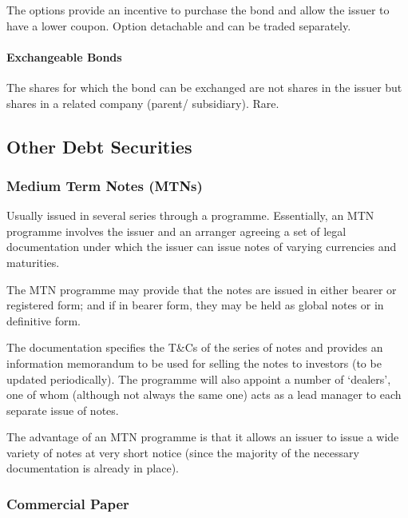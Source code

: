 \documentclass[
]{article}
\begin{document}
The options provide an incentive to purchase the bond and allow the
issuer to have a lower coupon. Option detachable and can be traded
separately.

\hypertarget{exchangeable-bonds}{%
\paragraph{Exchangeable Bonds}\label{exchangeable-bonds}}

The shares for which the bond can be exchanged are not shares in the
issuer but shares in a related company (parent/ subsidiary). Rare.

\hypertarget{other-debt-securities}{%
\subsection{Other Debt Securities}\label{other-debt-securities}}

\hypertarget{medium-term-notes-mtns}{%
\subsubsection{Medium Term Notes (MTNs)}\label{medium-term-notes-mtns}}

Usually issued in several series through a programme. Essentially, an
MTN programme involves the issuer and an arranger agreeing a set of
legal documentation under which the issuer can issue notes of varying
currencies and maturities.

The MTN programme may provide that the notes are issued in either bearer
or registered form; and if in bearer form, they may be held as global
notes or in definitive form.

The documentation specifies the T\&Cs of the series of notes and
provides an information memorandum to be used for selling the notes to
investors (to be updated periodically). The programme will also appoint
a number of `dealers', one of whom (although not always the same one)
acts as a lead manager to each separate issue of notes.

The advantage of an MTN programme is that it allows an issuer to issue a
wide variety of notes at very short notice (since the majority of the
necessary documentation is already in place).

\hypertarget{commercial-paper}{%
\subsubsection{Commercial Paper}\label{commercial-paper}}
\end{document}
